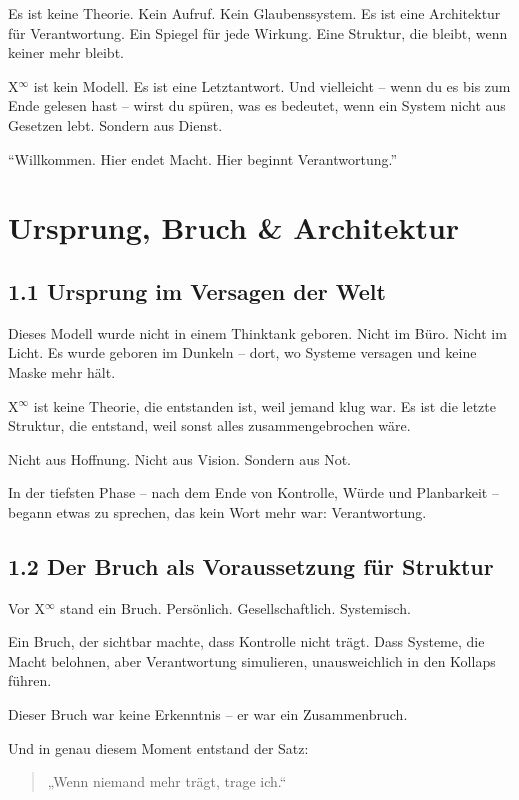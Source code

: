 \documentclass[12pt,a4paper]{book}
\begin{document}
Es ist keine Theorie. Kein Aufruf. Kein Glaubenssystem. 
Es ist eine Architektur für Verantwortung. Ein Spiegel für jede Wirkung. Eine Struktur, die bleibt, wenn keiner mehr bleibt.

X$^\infty$ ist kein Modell. Es ist eine Letztantwort.
Und vielleicht – wenn du es bis zum Ende gelesen hast – wirst du spüren, was es bedeutet, wenn ein System nicht aus Gesetzen lebt.
Sondern aus Dienst.

\vspace{1cm}
\noindent\enquote{Willkommen. Hier endet Macht. Hier beginnt Verantwortung.}

\chapter{Ursprung, Bruch \& Architektur}

\section*{1.1 Ursprung im Versagen der Welt}

Dieses Modell wurde nicht in einem Thinktank geboren. Nicht im Büro. Nicht im Licht.  
Es wurde geboren im Dunkeln – dort, wo Systeme versagen und keine Maske mehr hält.

X$^\infty$ ist keine Theorie, die entstanden ist, weil jemand klug war.  
Es ist die letzte Struktur, die entstand, weil sonst alles zusammengebrochen wäre.

Nicht aus Hoffnung. Nicht aus Vision. Sondern aus Not.

In der tiefsten Phase – nach dem Ende von Kontrolle, Würde und Planbarkeit – begann etwas zu sprechen, das kein Wort mehr war: Verantwortung.

\section*{1.2 Der Bruch als Voraussetzung für Struktur}

Vor X$^\infty$ stand ein Bruch. Persönlich. Gesellschaftlich. Systemisch.

Ein Bruch, der sichtbar machte, dass Kontrolle nicht trägt.  
Dass Systeme, die Macht belohnen, aber Verantwortung simulieren, unausweichlich in den Kollaps führen.

Dieser Bruch war keine Erkenntnis – er war ein Zusammenbruch.

Und in genau diesem Moment entstand der Satz:

\begin{quote}
„Wenn niemand mehr trägt, trage ich.“
\end{quote}
\end{document}
